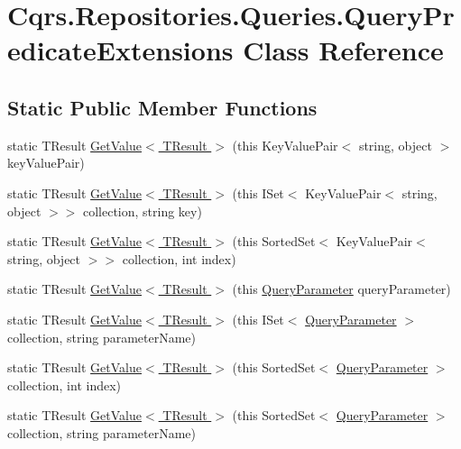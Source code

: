 \hypertarget{classCqrs_1_1Repositories_1_1Queries_1_1QueryPredicateExtensions}{}\section{Cqrs.\+Repositories.\+Queries.\+Query\+Predicate\+Extensions Class Reference}
\label{classCqrs_1_1Repositories_1_1Queries_1_1QueryPredicateExtensions}
\subsection*{Static Public Member Functions}
\begin{DoxyCompactItemize}
\item 
static T\+Result \hyperlink{classCqrs_1_1Repositories_1_1Queries_1_1QueryPredicateExtensions_aa76dc536f915299de4743ac9b801433d_aa76dc536f915299de4743ac9b801433d}{Get\+Value$<$ T\+Result $>$} (this Key\+Value\+Pair$<$ string, object $>$ key\+Value\+Pair)
\item 
static T\+Result \hyperlink{classCqrs_1_1Repositories_1_1Queries_1_1QueryPredicateExtensions_ae7ce4440706b552213ec680ac3391b7a_ae7ce4440706b552213ec680ac3391b7a}{Get\+Value$<$ T\+Result $>$} (this I\+Set$<$ Key\+Value\+Pair$<$ string, object $>$$>$ collection, string key)
\item 
static T\+Result \hyperlink{classCqrs_1_1Repositories_1_1Queries_1_1QueryPredicateExtensions_a54d17009ea7aa13b5ca6b4f653d06d82_a54d17009ea7aa13b5ca6b4f653d06d82}{Get\+Value$<$ T\+Result $>$} (this Sorted\+Set$<$ Key\+Value\+Pair$<$ string, object $>$$>$ collection, int index)
\item 
static T\+Result \hyperlink{classCqrs_1_1Repositories_1_1Queries_1_1QueryPredicateExtensions_a185f34dfbcf58429fc407b594c55f511_a185f34dfbcf58429fc407b594c55f511}{Get\+Value$<$ T\+Result $>$} (this \hyperlink{classCqrs_1_1Repositories_1_1Queries_1_1QueryParameter}{Query\+Parameter} query\+Parameter)
\item 
static T\+Result \hyperlink{classCqrs_1_1Repositories_1_1Queries_1_1QueryPredicateExtensions_a64fd0cc36edc56c037cd876034d92ebc_a64fd0cc36edc56c037cd876034d92ebc}{Get\+Value$<$ T\+Result $>$} (this I\+Set$<$ \hyperlink{classCqrs_1_1Repositories_1_1Queries_1_1QueryParameter}{Query\+Parameter} $>$ collection, string parameter\+Name)
\item 
static T\+Result \hyperlink{classCqrs_1_1Repositories_1_1Queries_1_1QueryPredicateExtensions_a8544c5998b585aac97320e4205093ba3_a8544c5998b585aac97320e4205093ba3}{Get\+Value$<$ T\+Result $>$} (this Sorted\+Set$<$ \hyperlink{classCqrs_1_1Repositories_1_1Queries_1_1QueryParameter}{Query\+Parameter} $>$ collection, int index)
\item 
static T\+Result \hyperlink{classCqrs_1_1Repositories_1_1Queries_1_1QueryPredicateExtensions_a8ede744015309723a289ace4795ba14a_a8ede744015309723a289ace4795ba14a}{Get\+Value$<$ T\+Result $>$} (this Sorted\+Set$<$ \hyperlink{classCqrs_1_1Repositories_1_1Queries_1_1QueryParameter}{Query\+Parameter} $>$ collection, string parameter\+Name)
\end{DoxyCompactItemize}


